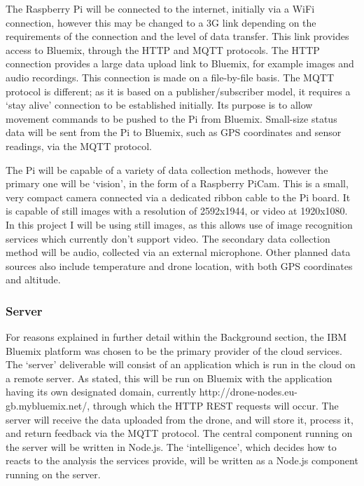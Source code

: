 \documentclass{article}
\begin{document}
The Raspberry Pi will be connected to the internet, initially via a WiFi connection, however this may be changed to a 3G link depending on the requirements of the connection and the level of data transfer. This link provides access to Bluemix, through the HTTP and MQTT protocols. The HTTP connection provides a large data upload link to Bluemix, for example images and audio recordings. This connection is made on a file-by-file basis. The MQTT protocol is different; as it is based on a publisher/subscriber model, it requires a `stay alive' connection to be established initially. Its purpose is to allow movement commands to be pushed to the Pi from Bluemix. Small-size status data will be sent from the Pi to Bluemix, such as GPS coordinates and sensor readings, via the MQTT protocol.

The Pi will be capable of a variety of data collection methods, however the primary one will be `vision', in the form of a Raspberry PiCam. This is a small, very compact camera connected via a dedicated ribbon cable to the Pi board. It is capable of still images with a resolution of 2592x1944, or video at 1920x1080. In this project I will be using still images, as this allows use of image recognition services which currently don't support video. The secondary data collection method will be audio, collected via an external microphone. Other planned data sources also include temperature and drone location, with both GPS coordinates and altitude.

\subsubsection{Server}
For reasons explained in further detail within the Background section, the IBM Bluemix platform was chosen to be the primary provider of the cloud services. The `server' deliverable will consist of an application which is run in the cloud on a remote server. As stated, this will be run on Bluemix with the application having its own designated domain, currently http://drone-nodes.eu-gb.mybluemix.net/, through which the HTTP REST requests will occur. The server will receive the data uploaded from the drone, and will store it, process it, and return feedback via the MQTT protocol. The central component running on the server will be written in Node.js. The `intelligence', which decides how to reacts to the analysis the services provide, will be written as a Node.js component running on the server.
\end{document}
